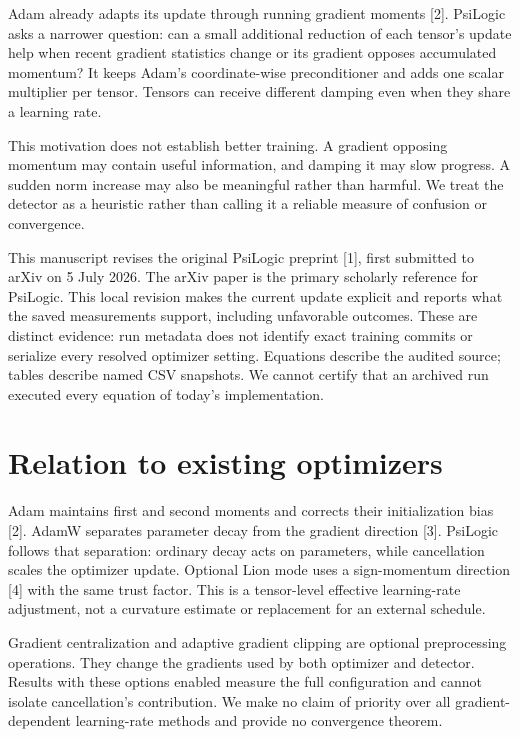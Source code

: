 \documentclass[11pt,a4paper]{article}
\begin{document}
Adam already adapts its update through running gradient moments [2]. PsiLogic asks a narrower question: can a small additional reduction of each tensor's update help when recent gradient statistics change or its gradient opposes accumulated momentum? It keeps Adam's coordinate-wise preconditioner and adds one scalar multiplier per tensor. Tensors can receive different damping even when they share a learning rate.

This motivation does not establish better training. A gradient opposing momentum may contain useful information, and damping it may slow progress. A sudden norm increase may also be meaningful rather than harmful. We treat the detector as a heuristic rather than calling it a reliable measure of confusion or convergence.

This manuscript revises the original PsiLogic preprint [1], first submitted to arXiv on 5 July 2026. The arXiv paper is the primary scholarly reference for PsiLogic. This local revision makes the current update explicit and reports what the saved measurements support, including unfavorable outcomes. These are distinct evidence: run metadata does not identify exact training commits or serialize every resolved optimizer setting. Equations describe the audited source; tables describe named CSV snapshots. We cannot certify that an archived run executed every equation of today's implementation.

\section{Relation to existing optimizers}

Adam maintains first and second moments and corrects their initialization bias [2]. AdamW separates parameter decay from the gradient direction [3]. PsiLogic follows that separation: ordinary decay acts on parameters, while cancellation scales the optimizer update. Optional Lion mode uses a sign-momentum direction [4] with the same trust factor. This is a tensor-level effective learning-rate adjustment, not a curvature estimate or replacement for an external schedule.

Gradient centralization and adaptive gradient clipping are optional preprocessing operations. They change the gradients used by both optimizer and detector. Results with these options enabled measure the full configuration and cannot isolate cancellation's contribution. We make no claim of priority over all gradient-dependent learning-rate methods and provide no convergence theorem.
\end{document}
